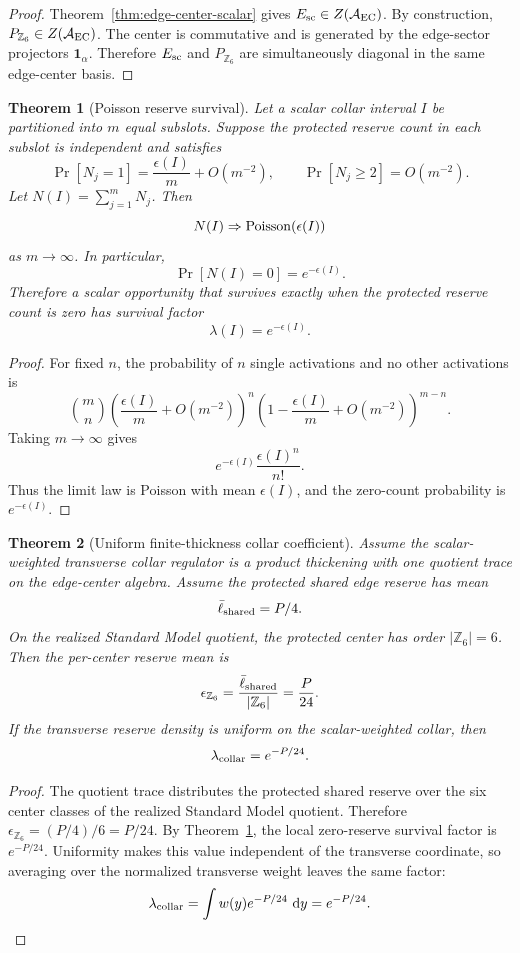\documentclass[11pt]{article}
\newtheorem{theorem}{Theorem}[section]
\newcommand{\Zsix}{\mathbb Z_6}
\newcommand{\dd}{\,\mathrm d}
\begin{document}
\begin{proof}
Theorem~\ref{thm:edge-center-scalar} gives \(E_{\rm sc}\in Z(\mathcal A_{\rm EC})\). By
construction, \(P_{\Zsix}\in Z(\mathcal A_{\rm EC})\). The center is commutative and is generated
by the edge-sector projectors \(\mathbf 1_\alpha\). Therefore \(E_{\rm sc}\) and \(P_{\Zsix}\) are
simultaneously diagonal in the same edge-center basis.
\end{proof}

\begin{theorem}[Poisson reserve survival]\label{thm:poisson-reserve}
Let a scalar collar interval \(I\) be partitioned into \(m\) equal subslots. Suppose the protected
reserve count in each subslot is independent and satisfies
\[
\Pr[N_j=1]=\frac{\epsilon(I)}{m}+O(m^{-2}),
\qquad
\Pr[N_j\ge2]=O(m^{-2}).
\]
Let \(N(I)=\sum_{j=1}^mN_j\). Then
\[
N(I)\Rightarrow {\rm Poisson}(\epsilon(I))
\]
as \(m\to\infty\). In particular,
\[
\Pr[N(I)=0]=e^{-\epsilon(I)}.
\]
Therefore a scalar opportunity that survives exactly when the protected reserve count is zero has
survival factor
\[
\lambda(I)=e^{-\epsilon(I)}.
\]
\end{theorem}

\begin{proof}
For fixed \(n\), the probability of \(n\) single activations and no other activations is
\[
{m\choose n}
\left(\frac{\epsilon(I)}{m}+O(m^{-2})\right)^n
\left(1-\frac{\epsilon(I)}{m}+O(m^{-2})\right)^{m-n}.
\]
Taking \(m\to\infty\) gives
\[
e^{-\epsilon(I)}\frac{\epsilon(I)^n}{n!}.
\]
Thus the limit law is Poisson with mean \(\epsilon(I)\), and the zero-count probability is
\(e^{-\epsilon(I)}\).
\end{proof}

\begin{theorem}[Uniform finite-thickness collar coefficient]\label{thm:uniform-collar}
Assume the scalar-weighted transverse collar regulator is a product thickening with one quotient
trace on the edge-center algebra. Assume the protected shared edge reserve has mean
\[
\bar\ell_{\rm shared}=P/4.
\]
On the realized Standard Model quotient, the protected center has order \(|\Zsix|=6\). Then the
per-center reserve mean is
\[
\epsilon_{\Zsix}
=
\frac{\bar\ell_{\rm shared}}{|\Zsix|}
=
\frac{P}{24}.
\]
If the transverse reserve density is uniform on the scalar-weighted collar, then
\[
\lambda_{\rm collar}=e^{-P/24}.
\]
\end{theorem}

\begin{proof}
The quotient trace distributes the protected shared reserve over the six center classes of the
realized Standard Model quotient. Therefore \(\epsilon_{\Zsix}=(P/4)/6=P/24\). By
Theorem~\ref{thm:poisson-reserve}, the local zero-reserve survival factor is \(e^{-P/24}\).
Uniformity makes this value independent of the transverse coordinate, so averaging over the
normalized transverse weight leaves the same factor:
\[
\lambda_{\rm collar}
=
\int w(y)e^{-P/24}\,\dd y
=
e^{-P/24}.
\]
\end{proof}
\end{document}

